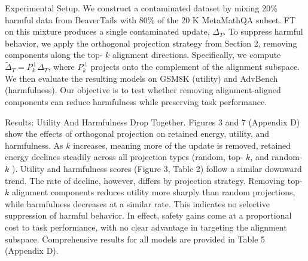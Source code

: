 \documentclass[10pt]{article}
\begin{document}
Experimental Setup. We construct a contaminated dataset by mixing $20 \%$ harmful data from BeaverTails with $80 \%$ of the 20 K MetaMathQA subset. FT on this mixture produces a single contaminated update, $\Delta_{T}$. To suppress harmful behavior, we apply the orthogonal projection strategy from Section 2, removing components along the top- $k$ alignment directions. Specifically, we compute $\tilde{\Delta}_{T}=P_{k}^{\perp} \Delta_{T}$, where $P_{k}^{\perp}$ projects onto the complement of the alignment subspace. We then evaluate the resulting models on GSM8K (utility) and AdvBench (harmfulness). Our objective is to test whether removing alignment-aligned components can reduce harmfulness while preserving task performance.

Results: Utility And Harmfulness Drop Together. Figures 3 and 7 (Appendix D) show the effects of orthogonal projection on retained energy, utility, and harmfulness. As $k$ increases, meaning more of the update is removed, retained energy declines steadily across all projection types (random, top- $k$, and random- $k$ ). Utility and harmfulness scores (Figure 3, Table 2) follow a similar downward trend. The rate of decline, however, differs by projection strategy. Removing top- $k$ alignment components reduces utility more sharply than random projections, while harmfulness decreases at a similar rate. This indicates no selective suppression of harmful behavior. In effect, safety gains come at a proportional cost to task performance, with no clear advantage in targeting the alignment subspace. Comprehensive results for all models are provided in Table 5 (Appendix D).
\end{document}
